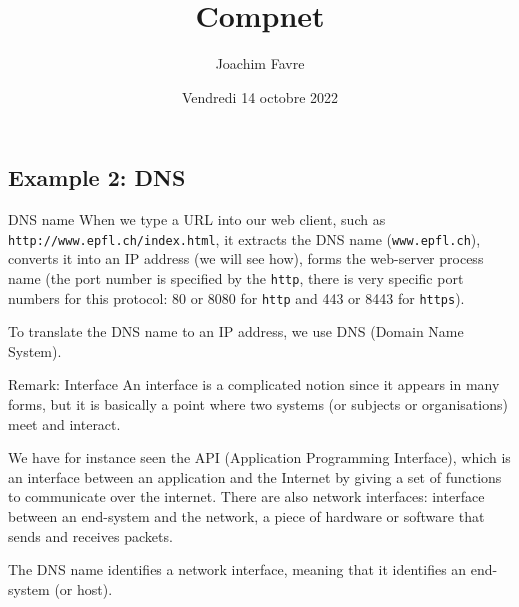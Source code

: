 \documentclass[a4paper]{article}
\title{Compnet}
\author{Joachim Favre}
\date{Vendredi 14 octobre 2022}
\begin{document}
\maketitle


\subsection{Example 2: DNS}
\begin{parag}{DNS name}
    When we type a URL into our web client, such as \texttt{http://www.epfl.ch/index.html}, it extracts the DNS name (\texttt{www.epfl.ch}), converts it into an IP address (we will see how), forms the web-server process name (the port number is specified by the \texttt{http}, there is very specific port numbers for this protocol: 80 or 8080 for \texttt{http} and 443 or 8443 for \texttt{https}).

    To translate the DNS name to an IP address, we use DNS (Domain Name System).

    \begin{subparag}{Remark: Interface}
        An interface is a complicated notion since it appears in many forms, but it is basically a point where two systems (or subjects or organisations) meet and interact.

        We have for instance seen the API (Application Programming Interface), which is an interface between an application and the Internet by giving a set of functions to communicate over the internet. There are also network interfaces: interface between an end-system and the network, a piece of hardware or software that sends and receives packets.

        The DNS name identifies a network interface, meaning that it identifies an end-system (or host).
    \end{subparag}
\end{parag}
\end{document}

